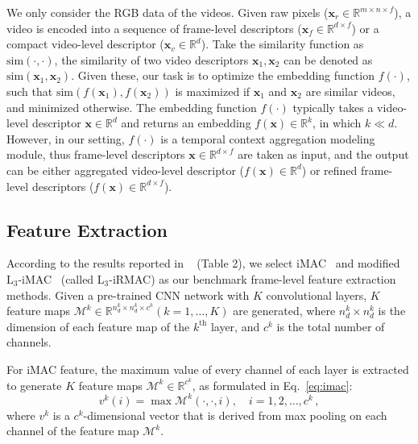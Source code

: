 \documentclass[10pt,twocolumn,letterpaper]{article}
\begin{document}
We only consider the RGB data of the videos. Given raw pixels ($\mathbf{x}_{r} \in \mathbb{R}^{m\times n\times f}$), a video is encoded into a sequence of frame-level descriptors ($\mathbf{x}_{f} \in \mathbb{R}^{d \times f}$) or a compact video-level descriptor ($\mathbf{x}_{v} \in \mathbb{R}^{d}$). Take the similarity function as $\text{sim}(\cdot,\cdot)$, the similarity of two video descriptors $\mathbf{x}_{1}, \mathbf{x}_{2}$ can be denoted as $\text{sim}(\mathbf{x}_{1}, \mathbf{x}_{2})$. Given these, our task is to optimize the embedding function $f(\cdot)$, such that $\text{sim}\left( f\left(\mathbf{x}_{1}\right), f\left(\mathbf{x}_{2}\right) \right)$ is maximized if $\mathbf{x}_{1}$ and $\mathbf{x}_{2}$ are similar videos, and minimized otherwise. The embedding function $f(\cdot)$ typically takes a video-level descriptor $\mathbf{x} \in \mathbb{R}^d$ and returns an embedding $f(\mathbf{x}) \in \mathbb{R}^k$, in which $k \ll d$. However, in our setting, $f(\cdot)$ is a 
temporal context aggregation modeling module, thus frame-level descriptors $\mathbf{x} \in \mathbb{R}^{d \times f}$ are taken as input, and the output can be either aggregated video-level descriptor ($f(\mathbf{x}) \in \mathbb{R}^{d}$) or refined frame-level descriptors ($f(\mathbf{x}) \in \mathbb{R}^{d \times f}$).

\subsection{Feature Extraction} \label{subsection:featextract}
According to the results reported in ~\cite{kordopatis2019visil} (Table 2), we select iMAC~\cite{gordo2017end} and modified $\text{L}_{3}$-iMAC~\cite{kordopatis2019visil} (called $\text{L}_3$-iRMAC) as our benchmark frame-level feature extraction methods. Given a pre-trained CNN network with $K$ convolutional layers, $K$ feature maps $\mathcal{M}^{k} \in \mathbb{R}^{n_{d}^{k}\times n_{d}^{k}\times c^{k}}(k=1,\dots,K)$ are generated, where
$n_{d}^{k}\times n_{d}^{k}$ is the dimension of each feature map of the $k^{\text{th}}$ layer, and $c^k$ is the total number of channels. 

For iMAC feature, the maximum value of every channel of each layer is extracted to generate $K$ feature maps $\mathcal{M}^{k} \in \mathbb{R}^{c^k}$, as formulated in Eq.~\ref{eq:imac}:
\begin{equation}
    \label{eq:imac}
    v^{k}(i) = \max \mathcal{M}^{k}(\cdot, \cdot, i),\quad i=1,2,\dots,c^{k} \,,
\end{equation}
where $v^{k}$ is a $c^{k}$-dimensional vector that is derived from max pooling on each channel of the feature map $\mathcal{M}^{k}$.
\end{document}
